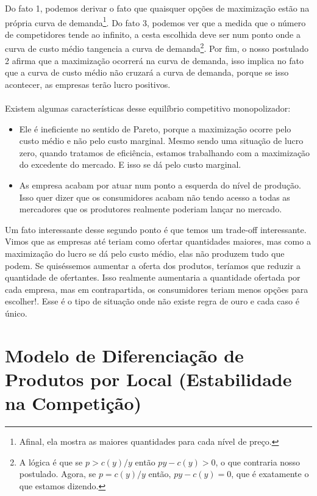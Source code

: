\documentclass[a4paper,11pt,oneside]{book}
\theoremstyle{definition}
\theoremstyle{break}
\begin{document}
Do fato 1, podemos derivar o fato que quaisquer opções de maximização estão na própria curva de demanda\footnote{Afinal, ela mostra as maiores quantidades para cada nível de preço.}. Do fato 3, podemos ver que a medida que o número de competidores tende ao infinito, a cesta escolhida deve ser num ponto onde a curva de custo médio tangencia a curva de demanda\footnote{A lógica é que se $p > c(y)/y$ então $py - c(y) > 0$, o que contraria nosso postulado. Agora, se $p = c(y)/y$ então, $py - c(y) = 0$, que é exatamente o que estamos dizendo.}. Por fim, o nosso postulado 2 afirma que a maximização ocorrerá na curva de demanda, isso implica no fato que a curva de custo médio não cruzará a curva de demanda, porque se isso acontecer, as empresas terão lucro positivos.
\\~\\
Existem algumas características desse equilíbrio competitivo monopolizador:
\begin{itemize}
\item Ele é ineficiente no sentido de Pareto, porque a maximização ocorre pelo custo médio e não pelo custo marginal. Mesmo sendo uma situação de lucro zero, quando tratamos de eficiência, estamos trabalhando com a maximização do excedente do mercado. E isso se dá pelo custo marginal.
\item As empresa acabam por atuar num ponto a esquerda do nível de produção. Isso quer dizer que os consumidores acabam não tendo acesso a todas as mercadores que os produtores realmente poderiam lançar no mercado.
\end{itemize}

Um fato interessante desse segundo ponto é que temos um trade-off interessante. Vimos que as empresas até teriam como ofertar quantidades maiores, mas como a maximização do lucro se dá pelo custo médio, elas não produzem tudo que podem. Se quiséssemos aumentar a oferta dos produtos, teríamos que reduzir a quantidade de ofertantes. Isso realmente aumentaria a quantidade ofertada por cada empresa, mas em contrapartida, os consumidores teriam menos opções para escolher!. Esse é o tipo de situação onde não existe regra de ouro e cada caso é único.

\section{Modelo de Diferenciação de Produtos por Local (Estabilidade na Competição)}
\end{document}
